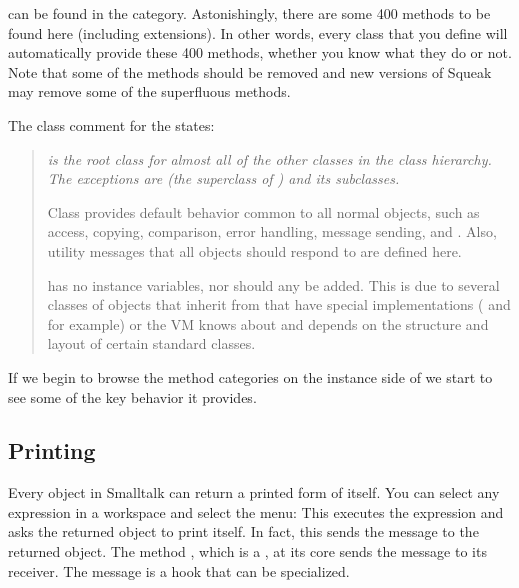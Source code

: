 \documentclass[a4paper,10pt,twoside]{book}
\begin{document}
 can be found in the  category.
Astonishingly, there are some 400 methods to be found here (including extensions).
In other words, every class that you define will automatically provide these 400 methods, whether you know what they do or not.
Note that some of the methods should be removed and new versions of Squeak may remove some of the superfluous methods. 

The class comment for the  states:

\begin{quote}\itshape
     is the root class for almost all of the other classes in the class hierarchy.
    The exceptions are  (the superclass of ) and its subclasses.
    
    Class  provides default behavior common to all normal objects, such as access, copying, comparison, error handling, message sending, and .
    Also, utility messages that all objects should respond to are defined here.
    
     has no instance variables, nor should any be added.
    This is due to several classes of objects that inherit from  that have special implementations ( and  for example) or the VM knows about and depends on the structure and layout of certain standard classes.
\end{quote}

If we begin to browse the method categories on the instance side of  we start to see some of the key behavior it provides.

\subsection{Printing}
Every object in Smalltalk can return a printed form of itself.
You can select any expression in a workspace and select the  menu:
This executes the expression and asks the returned object to print itself.
In fact, this sends the message  to the returned object.
The method , which is a , at its core sends the message  to its receiver.
The message  is a hook that can be specialized. 
\end{document}
